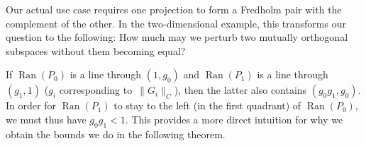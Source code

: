 \documentclass[pdftex]{sigma}
\numberwithin{equation}{section}
\DeclareMathOperator{\Ran}{Ran}
\begin{document}
		Our actual use case requires one projection to form a Fredholm pair with the complement of the other. In the two-dimensional example, this transforms our question to the following: How much may we perturb two mutually orthogonal subspaces without them becoming equal?

\begin{figure}[ht]\centering
		\end{figure}
		
		If $\Ran(P_0)$ is a line through $(1,g_0)$ and $\Ran(P_1)$ is a line through $(g_1,1)$ ($g_i$ corresponding to~$\|G_i\|_C$), then the latter also contains $(g_0g_1,g_0)$. In order for $\Ran(P_1)$ to stay to the left (in the first quadrant) of $\Ran(P_0)$, we must thus have $g_0g_1<1$. This provides a more direct intuition for why we obtain the bounds we do in the following theorem.
	
\end{document}
